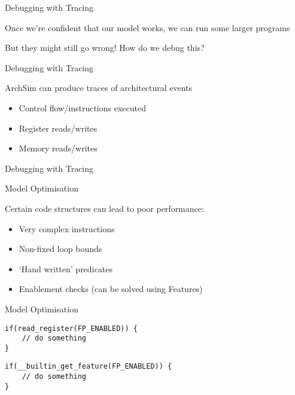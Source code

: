 \begin{frame}{Debugging with Tracing}

Once we're confident that our model works, we can run some larger programs

\pause

But they might still go wrong! How do we debug this?

\end{frame}

\begin{frame}{Debugging with Tracing}

ArchSim can produce traces of architectural events
\begin{itemize}
\item Control flow/instructions executed
\item Register reads/writes
\item Memory reads/writes
\end{itemize}

\end{frame}

\begin{frame}{Debugging with Tracing}

\end{frame}

\begin{frame}{Model Optimisation}

Certain code structures can lead to poor performance:
\begin{itemize}
\item Very complex instructions
\item Non-fixed loop bounds
\item `Hand written' predicates
\item Enablement checks (can be solved using Features)
\end{itemize} 

\end{frame}

\begin{frame}[fragile]{Model Optimisation}
\begin{lstlisting}
if(read_register(FP_ENABLED)) {
	// do something
}
\end{lstlisting}

\begin{lstlisting}
if(__builtin_get_feature(FP_ENABLED)) {
	// do something
}
\end{lstlisting}

\end{frame}
